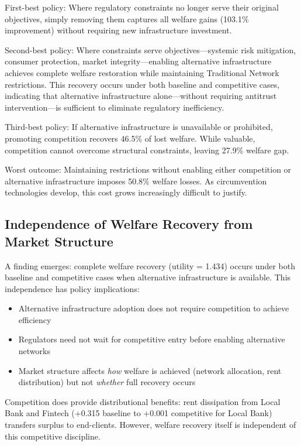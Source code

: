 First-best policy: Where regulatory constraints no longer serve their original objectives, simply removing them captures all welfare gains (103.1\% improvement) without requiring new infrastructure investment.

Second-best policy: Where constraints serve objectives—systemic risk mitigation, consumer protection, market integrity—enabling alternative infrastructure achieves complete welfare restoration while maintaining Traditional Network restrictions. This recovery occurs under both baseline and competitive cases, indicating that alternative infrastructure alone—without requiring antitrust intervention—is sufficient to eliminate regulatory inefficiency.

Third-best policy: If alternative infrastructure is unavailable or prohibited, promoting competition recovers 46.5\% of lost welfare. While valuable, competition cannot overcome structural constraints, leaving 27.9\% welfare gap.

Worst outcome: Maintaining restrictions without enabling either competition or alternative infrastructure imposes 50.8\% welfare losses. As circumvention technologies develop, this cost grows increasingly difficult to justify.

\subsection{Independence of Welfare Recovery from Market Structure}

A finding emerges: complete welfare recovery (utility = 1.434) occurs under both baseline and competitive cases when alternative infrastructure is available. This independence has policy implications:

\begin{itemize}
    \item Alternative infrastructure adoption does not require competition to achieve efficiency
    \item Regulators need not wait for competitive entry before enabling alternative networks
    \item Market structure affects \emph{how} welfare is achieved (network allocation, rent distribution) but not \emph{whether} full recovery occurs
\end{itemize}

Competition does provide distributional benefits: rent dissipation from Local Bank and Fintech (+0.315 baseline to +0.001 competitive for Local Bank) transfers surplus to end-clients. However, welfare recovery itself is independent of this competitive discipline.

